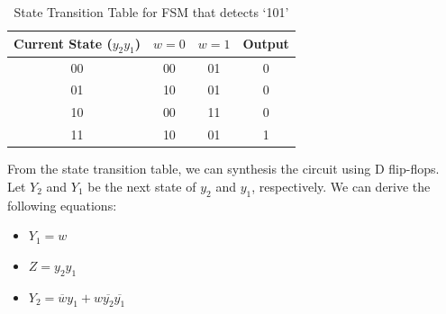 \documentclass[11pt]{report}
\begin{document}
\begin{example}
    \begin{table}[h!]
        \centering
        \begin{tabular}{|c|cc|c|}
            \hline
            Current State ($y_2 y_1$) & $w=0$ & $w=1$ & Output \\
            \hline
            00 & 00 & 01 & 0 \\
            01 & 10 & 01 & 0 \\
            10 & 00 & 11 & 0 \\
            11 & 10 & 01 & 1 \\
            \hline
        \end{tabular}
        \caption{State Transition Table for FSM that detects `101'}
        \label{tab:fsm_state_transition_table}
    \end{table}

    From the state transition table, we can synthesis the circuit using D flip-flops. Let $Y_2$ and $Y_1$ be the next state of $y_2$ and $y_1$, respectively. We can derive the following equations:
    \begin{itemize}
        \item $Y_1 = w$
        \item $Z = y_2 y_1$
        \item $Y_2 = \overline{w} y_1 + w \overline{y_2} \overline{y_1}$
    \end{itemize}
    
\end{example}
\end{document}
